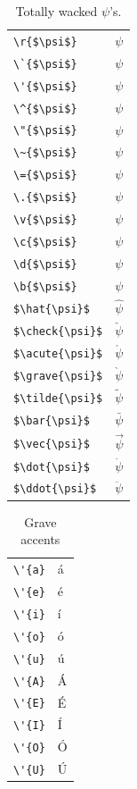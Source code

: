﻿\documentclass{article}
\begin{document}
\begin{table}
\pagebreak
\begin{center}
\begin{tabular}{ll}
\verb#\r{$\psi$}#& \r{$\psi$}\\
\verb#\`{$\psi$}#& \`{$\psi$}\\
\verb#\'{$\psi$}#& \'{$\psi$}\\
\verb#\^{$\psi$}#& \^{$\psi$}\\
\verb#\"{$\psi$}#& \"{$\psi$}\\
\verb#\~{$\psi$}#& \~{$\psi$}\\
\verb#\={$\psi$}#& \={$\psi$}\\
\verb#\.{$\psi$}#& \.{$\psi$}\\
\verb#\v{$\psi$}#& \v{$\psi$}\\
\verb#\c{$\psi$}#& \c{$\psi$}\\
\verb#\d{$\psi$}#& \d{$\psi$}\\
\verb#\b{$\psi$}#& \b{$\psi$}\\
\verb#$\hat{\psi}$#& $\hat{\psi}$\\
\verb#$\check{\psi}$#& $\check{\psi}$\\
\verb#$\acute{\psi}$#& $\acute{\psi}$\\
\verb#$\grave{\psi}$#& $\grave{\psi}$\\
\verb#$\tilde{\psi}$#& $\tilde{\psi}$\\
\verb#$\bar{\psi}$#& $\bar{\psi}$\\
\verb#$\vec{\psi}$#& $\vec{\psi}$\\
\verb#$\dot{\psi}$#& $\dot{\psi}$\\
\verb#$\ddot{\psi}$#& $\ddot{\psi}$
\end{tabular}
\caption{Totally wacked $\psi$'s.}
\end{center}
\end{table}
\pagebreak

\begin{table}
\begin{center}
\begin{tabular}{ll}
\verb#\'{a}#& \'{a}\\
\verb#\'{e}#& \'{e}\\
\verb#\'{i}#& \'{i}\\
\verb#\'{o}#& \'{o}\\
\verb#\'{u}#& \'{u}\\
\verb#\'{A}#& \'{A}\\
\verb#\'{E}#& \'{E}\\
\verb#\'{I}#& \'{I}\\
\verb#\'{O}#& \'{O}\\
\verb#\'{U}#& \'{U}
\end{tabular}
\caption{Grave accents}
\end{center}
\end{table}
\end{document}
